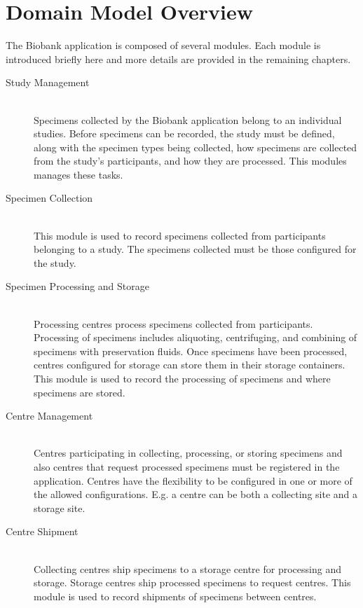 \chapter{Domain Model Overview}

The Biobank application is composed of several modules. Each module is
introduced briefly here and more details are provided in the remaining
chapters.

\begin{description}

\item[Study Management] \hfill \\ Specimens collected by the Biobank
  application belong to an individual studies. Before specimens can be
  recorded, the study must be defined, along with the specimen types being
  collected, how specimens are collected from the study's participants, and
  how they are processed. This modules manages these tasks.

\item[Specimen Collection] \hfill \\ This module is used to record
  specimens collected from participants belonging to a study. The specimens
  collected must be those configured for the study.

\item[Specimen Processing and Storage] \hfill \\ Processing centres process
  specimens collected from participants. Processing of specimens includes
  aliquoting, centrifuging, and combining of specimens with preservation
  fluids.  Once specimens have been processed, centres configured for storage
  can store them in their storage containers. This module is used to record
  the processing of specimens and where specimens are stored.

\item[Centre Management] \hfill \\ Centres participating in collecting,
  processing, or storing specimens and also centres that request processed
  specimens must be registered in the application. Centres have the
  flexibility to be configured in one or more of the allowed
  configurations. E.g. a centre can be both a collecting site and a storage
  site.

\item[Centre Shipment] \hfill \\ Collecting centres ship specimens to a
  storage centre for processing and storage. Storage centres ship processed
  specimens to request centres. This module is used to record shipments of
  specimens between centres.


\end{description}
